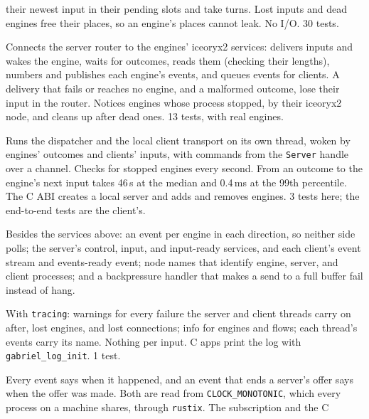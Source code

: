 \documentclass[11pt]{article}
\newcommand{\code}[1]{\texttt{#1}}
\begin{document}
\begin{description}[style=nextline, leftmargin=1.5em]
        their newest input in their pending slots and take turns. Lost inputs
        and dead engines free their places, so an engine's places cannot
        leak. No I/O. 30 tests.
  \item[Server dispatcher (\code{server/dispatch.rs})] Connects the server
        router to the engines' iceoryx2 services: delivers inputs and wakes
        the engine, waits for outcomes, reads them (checking their lengths),
        numbers and publishes each engine's events, and queues events for
        clients. A delivery that fails or reaches no engine, and a malformed
        outcome, lose their input in the router. Notices engines whose
        process stopped, by their iceoryx2 node, and cleans up after dead
        ones. 13 tests, with real engines.
  \item[Server thread (\code{server.rs}, \code{server/worker.rs})] Runs the
        dispatcher and the local client transport on its own thread, woken by
        engines' outcomes and clients' inputs, with commands from the
        \code{Server} handle over a channel. Checks for stopped engines every
        second. From an outcome to the engine's next
        input takes 46\,\textmu s at the median and 0.4\,ms at the 99th
        percentile. The C ABI creates a local server and adds and removes
        engines. 3 tests here; the end-to-end tests are the client's.
  \item[Services (\code{services.rs}, \code{naming.rs})] Besides the
        services above: an event per engine in each direction, so neither
        side polls; the server's control, input, and input-ready services,
        and each client's event stream and events-ready event; node names
        that identify engine, server, and client processes; and a
        backpressure handler that makes a send to a full buffer fail instead
        of hang.
  \item[Logging (\code{logging.rs})] With \code{tracing}: warnings for every
        failure the server and client threads carry on after, lost engines,
        and lost connections; info for engines and flows; each thread's
        events carry its name. Nothing per input. C apps print the log with
        \code{gabriel\_log\_init}. 1 test.
  \item[Timestamps (\code{clock.rs})] Every event says when it happened,
        and an event that ends a server's offer says when the offer was
        made. Both are read from \code{CLOCK\_MONOTONIC}, which every process
        on a machine shares, through \code{rustix}. The subscription and the C

\end{description}
\end{document}
